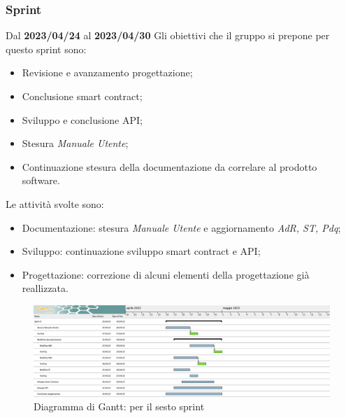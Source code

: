 \subsubsection{ Sprint}
Dal \textbf{2023/04/24} al \textbf{2023/04/30}
\newline
Gli obiettivi che il gruppo si prepone per questo sprint sono:
\begin{itemize}
    \item Revisione e avanzamento progettazione;
    \item Conclusione smart contract;
    \item Sviluppo e conclusione API;
    \item Stesura \textit{Manuale Utente};
    \item Continuazione stesura della documentazione da correlare al prodotto software.
\end{itemize}
Le attività svolte sono:
\begin{itemize}
    \item Documentazione: stesura \textit{Manuale Utente} e aggiornamento \textit{AdR, ST, Pdq};
    \item Sviluppo: continuazione sviluppo smart contract e API;
    \item Progettazione: correzione di alcuni elementi della progettazione già reallizzata.
\end{itemize}
\begin{figure}[H]
    \centering
    \includegraphics[scale=0.32]{src/img/Sprint 6.png}
    \caption{Diagramma di Gantt: per il sesto sprint}
\end{figure}
